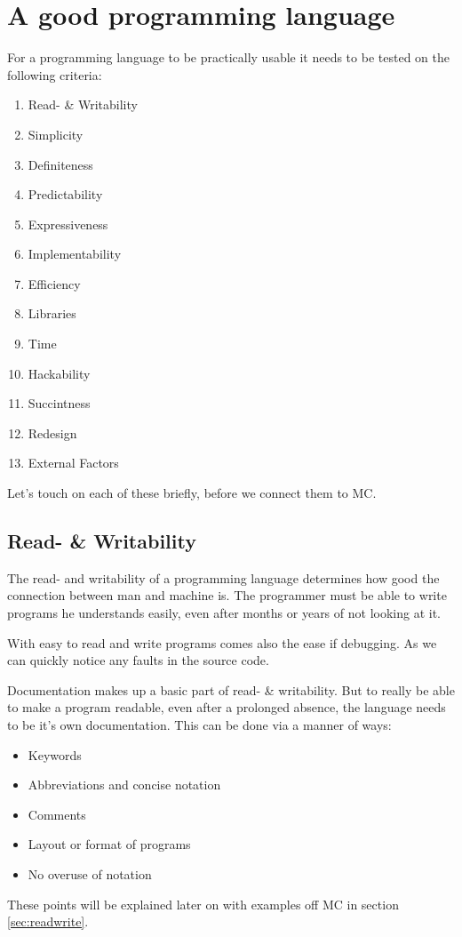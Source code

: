 \chapter{A good programming language}\label{sec:criteria}

For a programming language to be practically usable it needs to be tested on the following criteria\cite{khedker1997makes,graham2004hackers}:

\begin{multicols}{2}
\begin{enumerate}[noitemsep]
   \item Read- \& Writability
   \item Simplicity
   \item Definiteness
   \item Predictability
   \item Expressiveness
   \item Implementability
   \item Efficiency
   \item Libraries
   \item Time
   \item Hackability
   \item Succintness
   \item Redesign
   \item External Factors
\end{enumerate}
\end{multicols}
Let's touch on each of these briefly, before we connect them to MC.

\section{Read- \& Writability }
The read- and writability of a programming language determines how good the connection between man and machine is.
The programmer must be able to write programs he understands easily, even after months or years of not looking at it.

With easy to read and write programs comes also the ease if debugging.
As we can quickly notice any faults in the source code.

Documentation makes up a basic part of read- \& writability.
But to really be able to make a program readable, even after a prolonged absence, the language needs to be it's own documentation.
This can be done via a manner of ways:
\begin{itemize}[noitemsep]
   \item Keywords
   \item Abbreviations and concise notation
   \item Comments
   \item Layout or format of programs
   \item No overuse of notation
\end{itemize}
These points will be explained later on with examples off MC in section \ref{sec:readwrite}.

